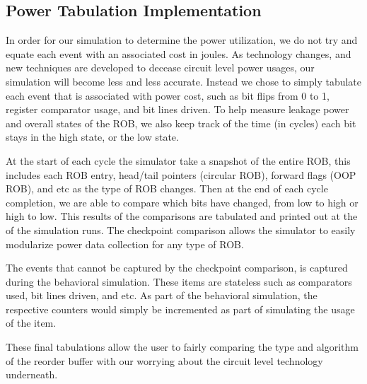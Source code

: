 \subsection{Power Tabulation Implementation}
In order for our simulation to determine the power utilization, we do not try and equate each event with an associated cost in joules.  As technology changes, and new techniques are 
developed to decease circuit level power usages, our simulation will become less and less accurate.  Instead we chose to simply tabulate each event that is associated with 
power cost, such as bit flips from 0 to 1, register comparator usage, and bit lines driven.  To help measure leakage power and overall states of the ROB, we also keep track of the 
time (in cycles) each bit stays in the high state, or the low state. 

At the start of each cycle the simulator take a snapshot of the entire ROB, this includes each ROB entry, head/tail pointers (circular ROB), forward flags (OOP ROB), and etc as the type 
of ROB changes.  Then at the end of each cycle completion, we are able to compare which bits have changed, from low to high or high to low.   This results of the comparisons are tabulated
and printed out at the of the simulation runs.  The checkpoint comparison allows the simulator to easily modularize power data collection for any type of ROB.

The events that cannot be captured by the checkpoint comparison, is captured during the behavioral simulation.  These items are stateless such as comparators used, bit lines driven, and etc.
As part of the behavioral simulation, the respective counters would simply be incremented as part of simulating the usage of the item.

These final tabulations allow the user to fairly comparing the type and algorithm of the reorder buffer with our worrying about the circuit level technology underneath. 





























